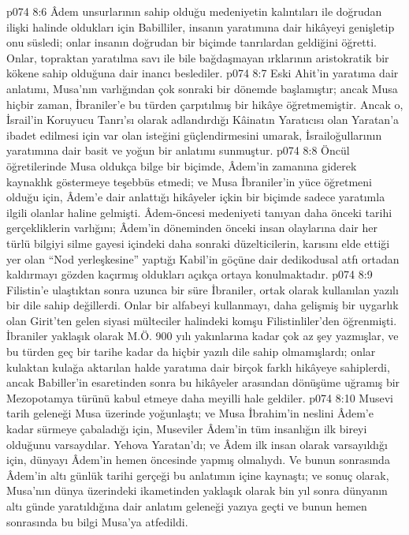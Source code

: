 \vs p074 8:6 Âdem unsurlarının sahip olduğu medeniyetin kalıntıları ile doğrudan ilişki halinde oldukları için Babilliler, insanın yaratımına dair hikâyeyi genişletip onu süsledi; onlar insanın doğrudan bir biçimde tanrılardan geldiğini öğretti. Onlar, topraktan yaratılma savı ile bile bağdaşmayan ırklarının aristokratik bir kökene sahip olduğuna dair inancı beslediler.
\vs p074 8:7 Eski Ahit’in yaratıma dair anlatımı, Musa’nın varlığından çok sonraki bir dönemde başlamıştır; ancak Musa hiçbir zaman, İbraniler’e bu türden çarpıtılmış bir hikâye öğretmemiştir. Ancak o, İsrail’in Koruyucu Tanrı’sı olarak adlandırdığı Kâinatın Yaratıcısı olan Yaratan’a ibadet edilmesi için var olan isteğini güçlendirmesini umarak, İsrailoğullarının yaratımına dair basit ve yoğun bir anlatımı sunmuştur.
\vs p074 8:8 Öncül öğretilerinde Musa oldukça bilge bir biçimde, Âdem’in zamanına giderek kaynaklık göstermeye teşebbüs etmedi; ve Musa İbraniler’in yüce öğretmeni olduğu için, Âdem’e dair anlattığı hikâyeler içkin bir biçimde sadece yaratımla ilgili olanlar haline gelmişti. Âdem\hyp{}öncesi medeniyeti tanıyan daha önceki tarihi gerçekliklerin varlığını; Âdem’in döneminden önceki insan olaylarına dair her türlü bilgiyi silme gayesi içindeki daha sonraki düzelticilerin, karısını elde ettiği yer olan “Nod yerleşkesine” yaptığı Kabil’in göçüne dair dedikodusal atfı ortadan kaldırmayı gözden kaçırmış oldukları açıkça ortaya konulmaktadır.
\vs p074 8:9 Filistin'e ulaştıktan sonra uzunca bir süre İbraniler, ortak olarak kullanılan yazılı bir dile sahip değillerdi. Onlar bir alfabeyi kullanmayı, daha gelişmiş bir uygarlık olan Girit’ten gelen siyasi mülteciler halindeki komşu Filistinliler’den öğrenmişti. İbraniler yaklaşık olarak M.Ö. 900 yılı yakınlarına kadar çok az şey yazmışlar, ve bu türden geç bir tarihe kadar da hiçbir yazılı dile sahip olmamışlardı; onlar kulaktan kulağa aktarılan halde yaratıma dair birçok farklı hikâyeye sahiplerdi, ancak Babiller’in esaretinden sonra bu hikâyeler arasından dönüşüme uğramış bir Mezopotamya türünü kabul etmeye daha meyilli hale geldiler.
\vs p074 8:10 Musevi tarih geleneği Musa üzerinde yoğunlaştı; ve Musa İbrahim’in neslini Âdem’e kadar sürmeye çabaladığı için, Museviler Âdem’in tüm insanlığın ilk bireyi olduğunu varsaydılar. Yehova Yaratan’dı; ve Âdem ilk insan olarak varsayıldığı için, dünyayı Âdem’in hemen öncesinde yapmış olmalıydı. Ve bunun sonrasında Âdem’in altı günlük tarihi gerçeği bu anlatımın içine kaynaştı; ve sonuç olarak, Musa’nın dünya üzerindeki ikametinden yaklaşık olarak bin yıl sonra dünyanın altı günde yaratıldığına dair anlatım geleneği yazıya geçti ve bunun hemen sonrasında bu bilgi Musa’ya atfedildi.
